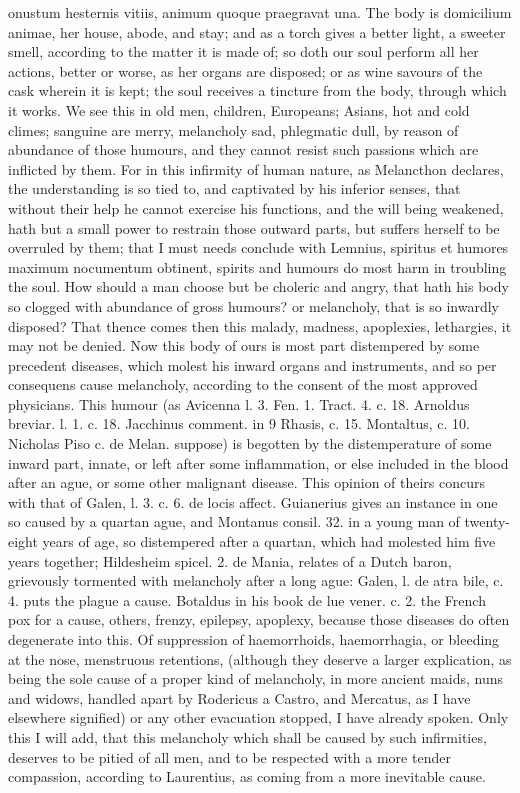 {onustum hesternis vitiis, animum quoque praegravat una. The body is
domicilium animae, her house, abode, and stay; and as a torch gives a
better light, a sweeter smell, according to the matter it is made of;
so doth our soul perform all her actions, better or worse, as her
organs are disposed; or as wine savours of the cask wherein it is kept;
the soul receives a tincture from the body, through which it works. We
see this in old men, children, Europeans; Asians, hot and cold climes;
sanguine are merry, melancholy sad, phlegmatic dull, by reason of
abundance of those humours, and they cannot resist such passions which
are inflicted by them. For in this infirmity of human nature, as
Melancthon declares, the understanding is so tied to, and captivated by
his inferior senses, that without their help he cannot exercise his
functions, and the will being weakened, hath but a small power to
restrain those outward parts, but suffers herself to be overruled by
them; that I must needs conclude with Lemnius, spiritus et humores
maximum nocumentum obtinent, spirits and humours do most harm in
troubling the soul. How should a man choose but be choleric and
angry, that hath his body so clogged with abundance of gross humours?
or melancholy, that is so inwardly disposed? That thence comes then
this malady, madness, apoplexies, lethargies, \etc{} it may not be denied.
Now this body of ours is most part distempered by some precedent
diseases, which molest his inward organs and instruments, and so per
consequens cause melancholy, according to the consent of the most
approved physicians. This humour (as Avicenna l. 3. Fen. 1.
Tract. 4. c. 18. Arnoldus breviar. l. 1. c. 18. Jacchinus comment. in 9
Rhasis, c. 15. Montaltus, c. 10. Nicholas Piso c. de Melan. \etc{}
suppose) is begotten by the distemperature of some inward part, innate,
or left after some inflammation, or else included in the blood after an
ague, or some other malignant disease. This opinion of theirs
concurs with that of Galen, \textlatin{l. 3. c. 6. de locis affect}. Guianerius
gives an instance in one so caused by a quartan ague, and Montanus
consil. 32. in a young man of twenty-eight years of age, so distempered
after a quartan, which had molested him five years together; \textlatin{Hildesheim
spicel. 2. de Mania}, relates of a Dutch baron, grievously tormented
with melancholy after a long ague: \textlatin{Galen, l. de atra bile, c. 4.}
puts the plague a cause. Botaldus in his book de lue vener. c. 2. the
French pox for a cause, others, frenzy, epilepsy, apoplexy, because
those diseases do often degenerate into this. Of suppression of
haemorrhoids, haemorrhagia, or bleeding at the nose, menstruous
retentions, (although they deserve a larger explication, as being the
sole cause of a proper kind of melancholy, in more ancient maids, nuns
and widows, handled apart by Rodericus a Castro, and Mercatus, as I
have elsewhere signified) or any other evacuation stopped, I have
already spoken. Only this I will add, that this melancholy which shall
be caused by such infirmities, deserves to be pitied of all men, and to
be respected with a more tender compassion, according to Laurentius, as
coming from a more inevitable cause.

}

